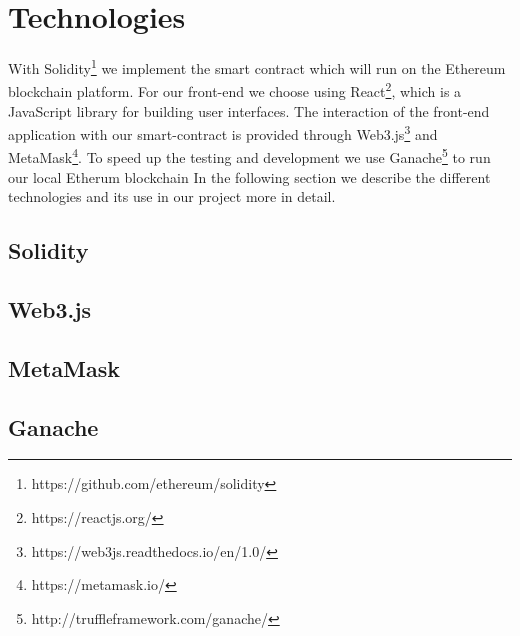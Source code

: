 \chapter{Technologies}\label{ch:technologies}
With Solidity\footnote{https://github.com/ethereum/solidity} we implement the smart contract which will run on the Ethereum blockchain platform. For our front-end we choose using React\footnote{https://reactjs.org/}, which is a JavaScript library for building user interfaces. The interaction of the front-end application with our smart-contract is provided through Web3.js\footnote{https://web3js.readthedocs.io/en/1.0/} and MetaMask\footnote{https://metamask.io/}. To speed up the testing and development we use Ganache\footnote{http://truffleframework.com/ganache/} to run our local Etherum blockchain
In the following section we describe the different technologies and its use in our project more in detail.
\section{Solidity}
\section{Web3.js}
\section{MetaMask}
\section{Ganache}
